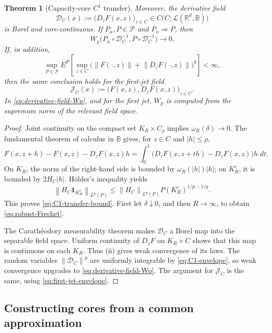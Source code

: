 \documentclass[11pt,reqno]{amsart}
\theoremstyle{plain}
\newtheorem{theorem}{Theorem}[section]
\theoremstyle{definition}
\newcommand{\R}{\mathbb R}
\newcommand{\cP}{\mathcal P}
\newcommand{\one}{\mathbf 1}
\newcommand{\dd}{\,d}
\newcommand{\norm}[1]{\left\lVert #1\right\rVert}
\begin{document}
\begin{theorem}[Capacity-core \(C^1\) transfer]
Moreover, the derivative field
\[
  \mathscr D_C(x):=\bigl(D_zF(x,z)\bigr)_{z\in C}
  \in C\bigl(C;\mathcal L(\R^d,\mathbb B)\bigr)
\]
is Borel and core-continuous.  If \(P_n,P\in\cP\) and \(P_n\Rightarrow P\),
then
\begin{equation}\label{eq:derivative-field-Wp}
  W_p\bigl(P_n\circ\mathscr D_C^{-1},
            P\circ\mathscr D_C^{-1}\bigr)\longrightarrow0.
\end{equation}
If, in addition,
\begin{equation}\label{eq:first-jet-envelope}
  \sup_{P\in\cP}E^P\!\left[
    \sup_{z\in C}
    \bigl(\norm{F(\cdot,z)}+\norm{D_zF(\cdot,z)}\bigr)^q
  \right]<\infty,
\end{equation}
then the same conclusion holds for the first-jet field
\[
  \mathscr J_C(x):=
  \bigl(F(x,z),D_zF(x,z)\bigr)_{z\in C}.
\]
In \eqref{eq:derivative-field-Wp}, and for the first jet, \(W_p\) is
computed from the supremum norm of the relevant field space.
\end{theorem}

\begin{proof}
Joint continuity on the compact set \(K_R\times C_\rho\) implies
\(\omega_R(\delta)\to0\).  The fundamental theorem of calculus in
\(\mathbb B\) gives, for \(z\in C\) and \(|h|\le\rho\),
\[
  F(x,z+h)-F(x,z)-D_zF(x,z)h
  =\int_0^1
    \bigl(D_zF(x,z+th)-D_zF(x,z)\bigr)h\,\dd t.
\]
On \(K_R\), the norm of the right-hand side is bounded by
\(\omega_R(|h|)|h|\); on \(K_R^c\), it is bounded by
\(2H_C|h|\).  H\"older's inequality yields
\[
  \norm{H_C\one_{K_R^c}}_{L^p(P)}
  \le \norm{H_C}_{L^q(P)}P(K_R^c)^{1/p-1/q}.
\]
This proves \eqref{eq:C1-transfer-bound}.  First let
\(\delta\downarrow0\), and then \(R\to\infty\), to obtain
\eqref{eq:robust-Frechet}.

The Carath\'eodory measurability theorem makes \(\mathscr D_C\) a Borel
map into the separable field space.  Uniform continuity of \(D_zF\) on
\(K_R\times C\) shows that this map is continuous on each \(K_R\).
Thus (ii) gives weak convergence of its laws.
The random variables \(\norm{\mathscr D_C}^p\) are uniformly integrable by
\eqref{eq:C1-envelope}, so weak convergence upgrades to
\eqref{eq:derivative-field-Wp}.  The argument for \(\mathscr J_C\) is the
same, using \eqref{eq:first-jet-envelope}.
\end{proof}

\subsection{Constructing cores from a common approximation}
\end{document}
